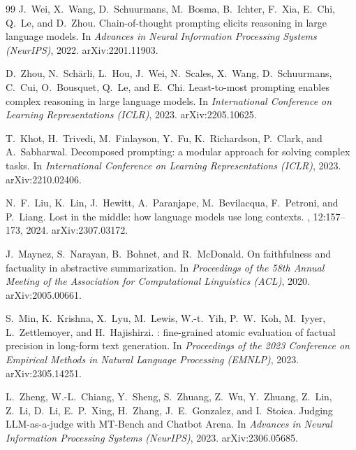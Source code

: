\documentclass[11pt]{article}
\begin{document}
\begin{thebibliography}{99}
J.~Wei, X.~Wang, D.~Schuurmans, M.~Bosma, B.~Ichter, F.~Xia, E.~Chi, Q.~Le, and D.~Zhou.
\newblock Chain-of-thought prompting elicits reasoning in large language models.
\newblock In {\em Advances in Neural Information Processing Systems ({NeurIPS})}, 2022.
\newblock arXiv:2201.11903.

D.~Zhou, N.~Sch\"arli, L.~Hou, J.~Wei, N.~Scales, X.~Wang, D.~Schuurmans, C.~Cui, O.~Bousquet, Q.~Le, and E.~Chi.
\newblock Least-to-most prompting enables complex reasoning in large language models.
\newblock In {\em International Conference on Learning Representations ({ICLR})}, 2023.
\newblock arXiv:2205.10625.

T.~Khot, H.~Trivedi, M.~Finlayson, Y.~Fu, K.~Richardson, P.~Clark, and A.~Sabharwal.
\newblock Decomposed prompting: a modular approach for solving complex tasks.
\newblock In {\em International Conference on Learning Representations ({ICLR})}, 2023.
\newblock arXiv:2210.02406.

N.~F.~Liu, K.~Lin, J.~Hewitt, A.~Paranjape, M.~Bevilacqua, F.~Petroni, and P.~Liang.
\newblock Lost in the middle: how language models use long contexts.
, 12:157--173, 2024.
\newblock arXiv:2307.03172.

J.~Maynez, S.~Narayan, B.~Bohnet, and R.~McDonald.
\newblock On faithfulness and factuality in abstractive summarization.
\newblock In {\em Proceedings of the 58th Annual Meeting of the Association for Computational Linguistics ({ACL})}, 2020.
\newblock arXiv:2005.00661.

S.~Min, K.~Krishna, X.~Lyu, M.~Lewis, W.-t.~Yih, P.~W.~Koh, M.~Iyyer, L.~Zettlemoyer, and H.~Hajishirzi.
: fine-grained atomic evaluation of factual precision in long-form text generation.
\newblock In {\em Proceedings of the 2023 Conference on Empirical Methods in Natural Language Processing ({EMNLP})}, 2023.
\newblock arXiv:2305.14251.

L.~Zheng, W.-L.~Chiang, Y.~Sheng, S.~Zhuang, Z.~Wu, Y.~Zhuang, Z.~Lin, Z.~Li, D.~Li, E.~P.~Xing, H.~Zhang, J.~E.~Gonzalez, and I.~Stoica.
\newblock Judging {LLM}-as-a-judge with {MT}-{B}ench and {C}hatbot {A}rena.
\newblock In {\em Advances in Neural Information Processing Systems ({NeurIPS})}, 2023.
\newblock arXiv:2306.05685.


\end{thebibliography}
\end{document}
